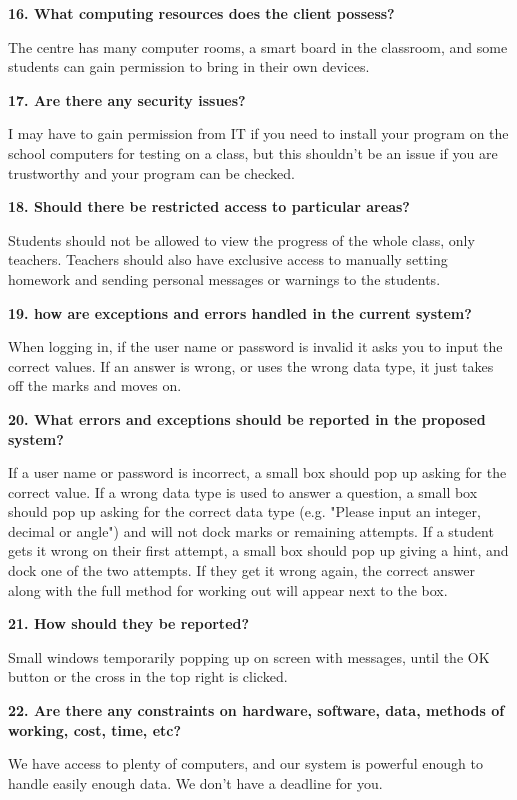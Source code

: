 \textbf{16. What computing resources does the client possess?}

The centre has many computer rooms, a smart board in the classroom, and some students can gain permission to bring in their own devices.

\textbf{17. Are there any security issues?}

I may have to gain permission from IT if you need to install your program on the school computers for testing on a class, but this shouldn't be an issue if you are trustworthy and your program can be checked.

\textbf{18. Should there be restricted access to particular areas?}

Students should not be allowed to view the progress of the whole class, only teachers. Teachers should also have exclusive access to manually setting homework and sending personal messages or warnings to the students. 

\textbf{19. how are exceptions and errors handled in the current system?}

When logging in, if the user name or password is invalid it asks you to input the correct values. If an answer is wrong, or uses the wrong data type, it just takes off the marks and moves on.

\textbf{20. What errors and exceptions should be reported in the proposed system?}

If a user name or password is incorrect, a small box should pop up asking for the correct value. If a wrong data type is used to answer a question, a small box should pop up asking for the correct data type (e.g. "Please input an integer, decimal or angle") and will not dock marks or remaining attempts. If a student gets it wrong on their first attempt, a small box should pop up giving a hint, and dock one of the two attempts. If they get it wrong again, the correct answer along with the full method for working out will appear next to the box.

\textbf{21. How should they be reported?}

Small windows temporarily popping up on screen with messages, until the OK button or the cross in the top right is clicked.

\textbf{22. Are there any constraints on hardware, software, data, methods of working, cost, time, etc?}

We have access to plenty of computers, and our system is powerful enough to handle easily enough data. We don't have a deadline for you. 

